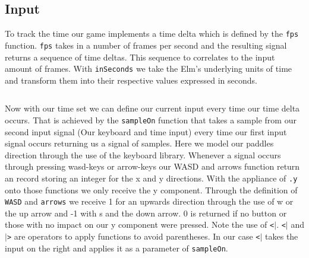 \documentclass[pdftex,a4paper]{extarticle}
\begin{document}
\subsection{Input}
To track the time our game implements a time delta which is defined by the {\tt fps}\cite{elm-time} function.
{\tt fps} takes in a number of frames per second and the resulting signal returns a sequence of time deltas.
This sequence to correlates to the input amount of frames.
With {\tt inSeconds} we take the Elm's underlying units of time and transform them into their respective values expressed in seconds. 
\inputminted [breaklines=true] {haskell}{pong(5a).hs}
Now with our time set we can define our current input every time our time delta occurs.
That is achieved by the {\tt sampleOn}\cite{elm-sampleOn} function that takes a sample from our second input signal (Our keyboard and time input) every time our first input signal occurs returning us a signal of samples.
Here we model our paddles direction through the use of the keyboard library.
Whenever a signal occurs through pressing wasd-keys or arrow-keys our WASD and arrows function return an record storing an integer for the x and y directions.
With the appliance of {\tt .y} onto those functions we only receive the y component.
Through the definition of {\tt WASD} and {\tt arrows} we receive 1 for an upwards direction through the use of w or the up arrow and -1 with s and the down arrow.
0 is returned if no button or those with no impact on our y component were pressed.
Note the use of {\tt\textless$\vert$}.
{\tt\textless$\vert$} and {\tt$\vert$\textgreater} are operators to apply functions to avoid parentheses.
In our case {\tt\textless$\vert$} takes the input on the right and applies it as a parameter of {\tt sampleOn}.
\inputminted [breaklines=true] {haskell}{pong(5b).hs}
\end{document}
